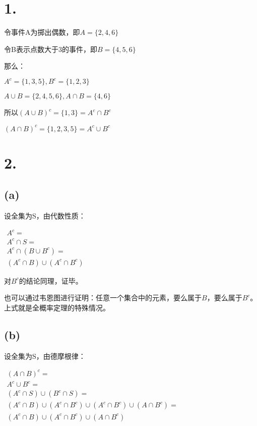 \documentclass[UTF8]{report}
\begin{document}
    \section*{1.}
        令事件A为掷出偶数，即$A = \{2, 4, 6\}$
        
        令B表示点数大于3的事件，即$B = \{4, 5, 6\}$

        那么：

        $A^c = \{1, 3, 5\}, B^c = \{1, 2, 3\}$

        $A \cup B = \{2, 4, 5, 6\}, A \cap B = \{4, 6\}$

        所以$(A \cup B)^c = \{1, 3\} = A^c \cap B^c$
        
        $(A \cap B)^c = \{1, 2, 3, 5\} = A^c \cup B^c$
    \section*{2.}
        \subsection*{(a)}
            设全集为S，由代数性质：
            
            $\begin{array}{lcr}
                A^c = \\
            A^c \cap S = \\
            A^c \cap (B \cup B^c) = \\
            (A^c \cap B) \cup (A^c \cap B^c)
            \end{array}$

            对$B^c$的结论同理，证毕。

            也可以通过韦恩图进行证明：任意一个集合中的元素，要么属于$B$，要么属于$B^c$。上式就是全概率定理的特殊情况。
        \subsection*{(b)}
            设全集为S，由德摩根律：

            $\begin{array}{lcr}
                (A \cap B)^c = \\
                A^c \cup B^c = \\
                (A^c \cap S) \cup (B^c \cap S) = \\
                (A^c \cap B) \cup  (A^c \cap B^c) \cup (A^c \cap B^c) \cup (A \cap B^c) = \\
                (A^c \cap B) \cup  (A^c \cap B^c) \cup (A \cap B^c)
            \end{array}$
\end{document}
